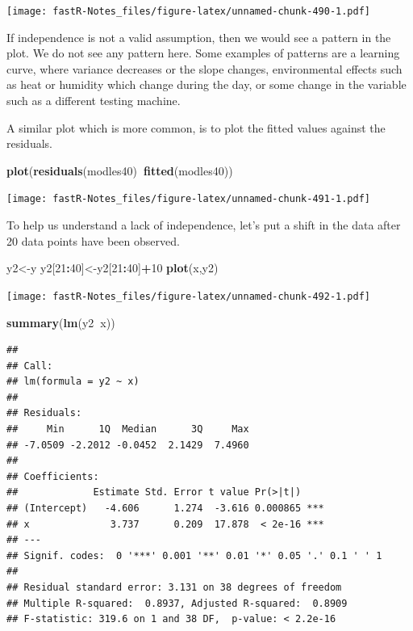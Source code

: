 \documentclass[]{book}
\newenvironment{Shaded}{\begin{snugshade}}{\end{snugshade}}
\newcommand{\KeywordTok}[1]{\textcolor[rgb]{0.13,0.29,0.53}{\textbf{#1}}}
\newcommand{\DecValTok}[1]{\textcolor[rgb]{0.00,0.00,0.81}{#1}}
\newcommand{\OperatorTok}[1]{\textcolor[rgb]{0.81,0.36,0.00}{\textbf{#1}}}
\newcommand{\NormalTok}[1]{#1}
\theoremstyle{definition}
\theoremstyle{definition}
\theoremstyle{definition}
\theoremstyle{remark}
\begin{document}
\texttt{[image: fastR-Notes\_files/figure-latex/unnamed-chunk-490-1.pdf]}

If independence is not a valid assumption, then we would see a pattern
in the plot. We do not see any pattern here. Some examples of patterns
are a learning curve, where variance decreases or the slope changes,
environmental effects such as heat or humidity which change during the
day, or some change in the variable such as a different testing machine.

A similar plot which is more common, is to plot the fitted values
against the residuals.

\begin{Shaded}
\begin{Highlighting}[]
\KeywordTok{plot}\NormalTok{(}\KeywordTok{residuals}\NormalTok{(modles40)}\OperatorTok{~}\KeywordTok{fitted}\NormalTok{(modles40))}
\end{Highlighting}
\end{Shaded}

\texttt{[image: fastR-Notes\_files/figure-latex/unnamed-chunk-491-1.pdf]}

To help us understand a lack of independence, let's put a shift in the
data after 20 data points have been observed.

\begin{Shaded}
\begin{Highlighting}[]
\NormalTok{y2<-y}
\NormalTok{y2[}\DecValTok{21}\OperatorTok{:}\DecValTok{40}\NormalTok{]<-y2[}\DecValTok{21}\OperatorTok{:}\DecValTok{40}\NormalTok{]}\OperatorTok{+}\DecValTok{10}
\KeywordTok{plot}\NormalTok{(x,y2)}
\end{Highlighting}
\end{Shaded}

\texttt{[image: fastR-Notes\_files/figure-latex/unnamed-chunk-492-1.pdf]}

\begin{Shaded}
\begin{Highlighting}[]
\KeywordTok{summary}\NormalTok{(}\KeywordTok{lm}\NormalTok{(y2}\OperatorTok{~}\NormalTok{x))}
\end{Highlighting}
\end{Shaded}

\begin{verbatim}
## 
## Call:
## lm(formula = y2 ~ x)
## 
## Residuals:
##     Min      1Q  Median      3Q     Max 
## -7.0509 -2.2012 -0.0452  2.1429  7.4960 
## 
## Coefficients:
##             Estimate Std. Error t value Pr(>|t|)    
## (Intercept)   -4.606      1.274  -3.616 0.000865 ***
## x              3.737      0.209  17.878  < 2e-16 ***
## ---
## Signif. codes:  0 '***' 0.001 '**' 0.01 '*' 0.05 '.' 0.1 ' ' 1
## 
## Residual standard error: 3.131 on 38 degrees of freedom
## Multiple R-squared:  0.8937, Adjusted R-squared:  0.8909 
## F-statistic: 319.6 on 1 and 38 DF,  p-value: < 2.2e-16
\end{verbatim}
\end{document}
